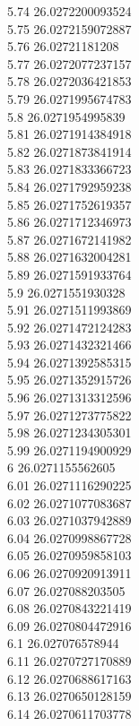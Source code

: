 {5.74	26.0272200093524\\
5.75	26.0272159072887\\
5.76	26.02721181208\\
5.77	26.0272077237157\\
5.78	26.0272036421853\\
5.79	26.0271995674783\\
5.8	26.0271954995839\\
5.81	26.0271914384918\\
5.82	26.0271873841914\\
5.83	26.0271833366723\\
5.84	26.0271792959238\\
5.85	26.0271752619357\\
5.86	26.0271712346973\\
5.87	26.0271672141982\\
5.88	26.0271632004281\\
5.89	26.0271591933764\\
5.9	26.0271551930328\\
5.91	26.0271511993869\\
5.92	26.0271472124283\\
5.93	26.0271432321466\\
5.94	26.0271392585315\\
5.95	26.0271352915726\\
5.96	26.0271313312596\\
5.97	26.0271273775822\\
5.98	26.0271234305301\\
5.99	26.0271194900929\\
6	26.0271155562605\\
6.01	26.0271116290225\\
6.02	26.0271077083687\\
6.03	26.0271037942889\\
6.04	26.0270998867728\\
6.05	26.0270959858103\\
6.06	26.0270920913911\\
6.07	26.027088203505\\
6.08	26.0270843221419\\
6.09	26.0270804472916\\
6.1	26.027076578944\\
6.11	26.0270727170889\\
6.12	26.0270688617163\\
6.13	26.0270650128159\\
6.14	26.0270611703778\\
}
